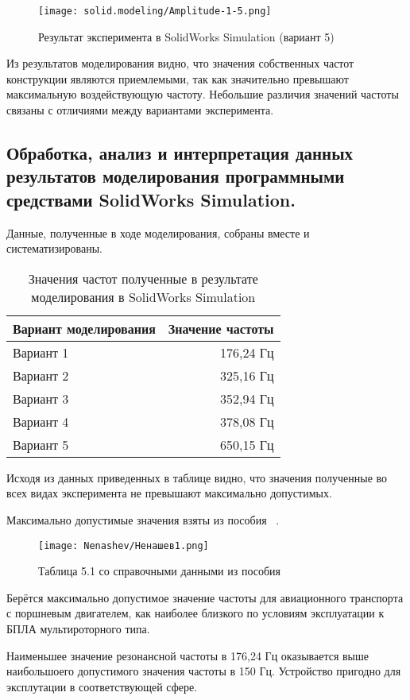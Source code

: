 \begin{figure}[H]
  \centering
  \texttt{[image: solid.modeling/Amplitude-1-5.png]} %
  \caption{Результат эксперимента в SolidWorks Simulation (вариант 5)}
\end{figure}

Из результатов моделирования видно, что значения собственных частот
конструкции являются приемлемыми, так как значительно превышают
максимальную воздействующую частоту. Небольшие различия значений
частоты связаны с отличиями между вариантами эксперимента.

\subsection{Обработка, анализ и интерпретация данных результатов
моделирования программными средствами SolidWorks Simulation.}

Данные, полученные в ходе моделирования, собраны вместе и
систематизированы.

\begin{table}[H]
  \centering
  \begin{tabular}{|l | r |}
    \hline
    Вариант моделирования & Значение частоты \\ \hline
    Вариант 1 & 176,24 Гц\\ \hline
    Вариант 2 & 325,16 Гц\\ \hline
    Вариант 3 & 352,94 Гц \\ \hline
    Вариант 4 & 378,08 Гц \\ \hline
    Вариант 5 & 650,15 Гц \\ \hline
  \end{tabular}
  \caption{Значения частот полученные в результате моделирования в SolidWorks Simulation}
\end{table}

Исходя из данных приведенных в таблице видно, что значения полученные
во всех видах эксперимента не превышают максимально допустимых.

Максимально допустимые значения взяты из пособия ~\cite{Nenashev}.

\begin{figure}[H]
  \centering
  \texttt{[image: Nenashev/Ненашев1.png]}
  \caption{Таблица 5.1 со справочными данными из пособия}
\end{figure}

Берётся максимально допустимое значение частоты для авиационного транспорта с
поршневым двигателем, как наиболее близкого по условиям эксплуатации к
БПЛА мультироторного типа.

Наименьшее значение резонансной частоты в 176,24 Гц оказывается выше
наибольшоего допустимого значения частоты в 150 Гц. Устройство пригодно для
эксплутации в соответствующей сфере.

\newpage

